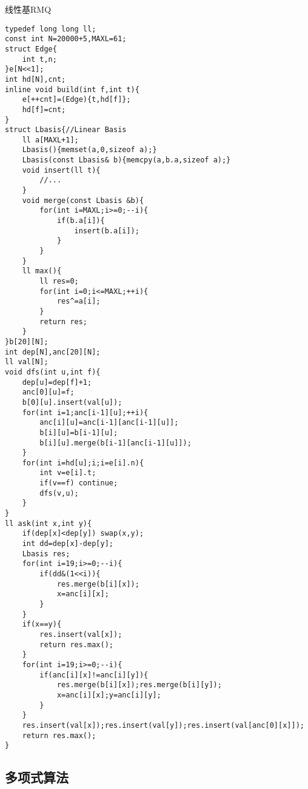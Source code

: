 \documentclass[UTF8]{ctexart}
\begin{document}
线性基RMQ

\begin{lstlisting}
typedef long long ll;
const int N=20000+5,MAXL=61;
struct Edge{
    int t,n;
}e[N<<1];
int hd[N],cnt;
inline void build(int f,int t){
    e[++cnt]=(Edge){t,hd[f]};
    hd[f]=cnt;
}
struct Lbasis{//Linear Basis 
    ll a[MAXL+1];
    Lbasis(){memset(a,0,sizeof a);}
    Lbasis(const Lbasis& b){memcpy(a,b.a,sizeof a);} 
    void insert(ll t){
        //...
    }
    void merge(const Lbasis &b){
        for(int i=MAXL;i>=0;--i){
            if(b.a[i]){
                insert(b.a[i]);
            }
        }
    }
    ll max(){
        ll res=0;
        for(int i=0;i<=MAXL;++i){
            res^=a[i];
        }
        return res;
    }
}b[20][N];
int dep[N],anc[20][N];
ll val[N];
void dfs(int u,int f){
    dep[u]=dep[f]+1;
    anc[0][u]=f;
    b[0][u].insert(val[u]);
    for(int i=1;anc[i-1][u];++i){
        anc[i][u]=anc[i-1][anc[i-1][u]];
        b[i][u]=b[i-1][u];
        b[i][u].merge(b[i-1][anc[i-1][u]]);
    }
    for(int i=hd[u];i;i=e[i].n){
        int v=e[i].t;
        if(v==f) continue;
        dfs(v,u);
    }
}
ll ask(int x,int y){
    if(dep[x]<dep[y]) swap(x,y);
    int dd=dep[x]-dep[y];
    Lbasis res;
    for(int i=19;i>=0;--i){
        if(dd&(1<<i)){
            res.merge(b[i][x]);
            x=anc[i][x];
        }
    }
    if(x==y){
        res.insert(val[x]);
        return res.max();
    }
    for(int i=19;i>=0;--i){
        if(anc[i][x]!=anc[i][y]){
            res.merge(b[i][x]);res.merge(b[i][y]);
            x=anc[i][x];y=anc[i][y];
        }
    }
    res.insert(val[x]);res.insert(val[y]);res.insert(val[anc[0][x]]);
    return res.max();
} 
\end{lstlisting}
\subsection{多项式算法}
\end{document}
